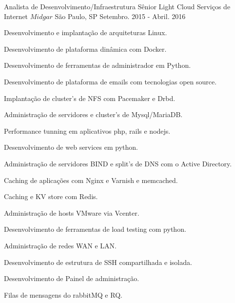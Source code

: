 \begin{cventries}
  \cventry
    {Analista de Desenvolvimento/Infraestrutura Sênior} %
    {Light Cloud Serviços de Internet \(Midgar\)} %
    {São Paulo, SP} %
    {Setembro. 2015 - Abril. 2016} %
    {
      \begin{cvitems} %
        \item {Desenvolvimento e implantação de arquiteturas Linux.}
        \item {Desenvolvimento de plataforma dinâmica com Docker.}
        \item {Desenvolvimento de ferramentas de administrador em Python.}
        \item {Desenvolvimento de plataforma de emails com tecnologias open source.}
        \item {Implantação de cluster’s de NFS com Pacemaker e Drbd.}
        \item {Administração de servidores e cluster’s de Mysql/MariaDB.}
        \item {Performance tunning em aplicativos php, rails e nodejs.}
        \item {Desenvolvimento de web services em python.}
        \item {Administração de servidores BIND e split’s de DNS com o Active Directory.}
        \item {Caching de aplicações com Nginx e Varnish e memcached.}
        \item {Caching e KV store com Redis.}
        \item {Administração de hosts VMware via Vcenter.}
        \item {Desenvolvimento de ferramentas de load testing com python.}
        \item {Administração de redes WAN e LAN.}
        \item {Desenvolvimento de estrutura de SSH compartilhada e isolada.}
        \item {Desenvolvimento de Painel de administração.}
        \item {Filas de mensagens do rabbitMQ e RQ.}
      \end{cvitems}
    }


\end{cventries}
